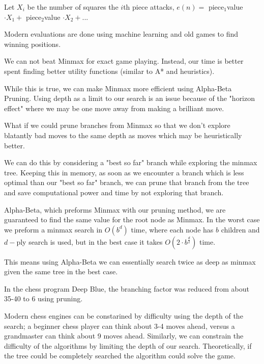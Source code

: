 \documentclass{chezarticle}
\begin{document}
\begin{example}
Let $X_i$ be the number of squares the $i$th piece attacks, $e(n) = $ piece$_1$value $ \cdot  X_1 + $ piece$_2$value $ \cdot X_2 + ...$
\end{example}
Modern evaluations are done using machine learning and old games to find winning positions. 
\begin{fact}
We can not beat Minmax for exact game playing. Instead, our time is better spent finding better utility functions (similar to A* and heuristics).
\end{fact}
While this is true, we can make Minmax more efficient using Alpha-Beta Pruning. Using depth as a limit to our search is an issue because of the "horizon effect" where we may be one move away from making a brilliant move. 
\begin{proposition}
What if we could prune branches from Minmax so that we don't explore blatantly bad moves to the same depth as moves which may be heuristically better.
\end{proposition}
We can do this by considering a "best so far" branch while exploring the minmax tree. Keeping this in memory, as soon as we encounter a branch which is less optimal than our "best so far" branch, we can prune that branch from the tree and save computational power and time by not exploring that branch. 
\begin{algorithm}
Alpha-Beta, which preforms Minmax with our pruning method, we are guaranteed to find the same value for the root node as Minmax. In the worst case we preform a minmax search in $O(b^d)$ time, where each node has $b$ children and $d-$ply search is used, but in the best case it takes $O(2\cdot b^{\frac{d}{2}})$ time. 
\end{algorithm}
This means using Alpha-Beta we can essentially search twice as deep as minmax given the same tree in the best case.
\begin{note}
In the chess program Deep Blue, the branching factor was reduced from about 35-40 to 6 using pruning.
\end{note}
Modern chess engines can be constarined by difficulty using the depth of the search; a beginner chess player can think about 3-4 moves ahead, versus a grandmaster can think about 9 moves ahead. Similarly, we can constrain the difficulty of the algorithms by limiting the depth of our search. Theoretically, if the tree could be completely searched the algorithm could solve the game.
\end{document}
